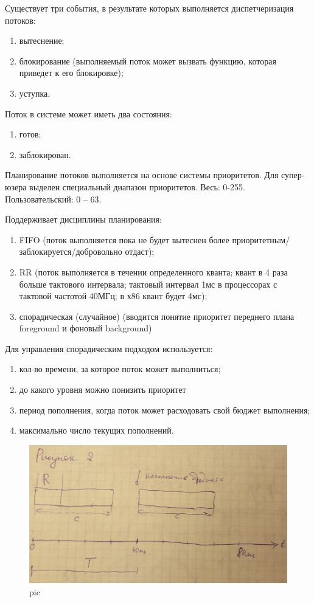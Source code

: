 Существует три события, в результате которых выполняется диспетчеризация потоков:
\begin{enumerate}
    \item вытеснение; 
    \item блокирование (выполняемый поток может вызвать функцию, которая приведет к его блокировке);
    \item уступка. 
\end{enumerate} 

Поток в системе может иметь два состояния:
\begin{enumerate}
    \item готов;
    \item заблокирован.
\end{enumerate} 

Планирование потоков выполняется на основе системы приоритетов. Для супер-юзера выделен специальный диапазон приоритетов. Весь: 0-255. Пользовательский: 0 – 63.

Поддерживает дисциплины планирования:
\begin{enumerate}
    \item FIFO (поток выполняется пока не будет вытеснен более приоритетным/заблокируется/добровольно отдаст);
    \item RR (поток выполняется в течении определенного кванта; квант в 4 раза больше тактового интервала; тактовый интервал 1мс в процессорах с тактовой частотой 40МГц; в х86 квант будет 4мс);
    \item спорадическая (случайное) (вводится понятие приоритет переднего плана foreground и фоновый background) 
\end{enumerate} 

Для управления спорадическим подходом используется:
\begin{enumerate}
    \item кол-во времени, за которое поток может выполниться;
    \item до какого уровня можно понизить приоритет
    \item период пополнения, когда поток может расходовать свой бюджет выполнения;
    \item максимально число текущих пополнений.
\end{enumerate} 

\begin{figure}[H]
    \centering
    \includegraphics[width=\textwidth]{pic/2.png}
    \caption{pic}
\end{figure}

